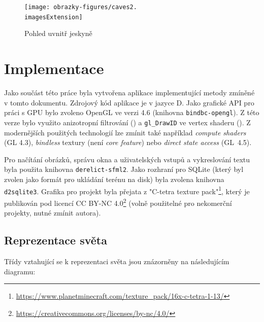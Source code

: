 \vfill

\begin{figure}[H]
	\texttt{[image: obrazky-figures/caves2.\\imagesExtension]}
	\caption{Pohled uvnitř jeskyně}
\end{figure}

\chapter{Implementace} \label{ch:impl}
Jako součást této práce byla vytvořena aplikace implementující metody zmíněné v tomto dokumentu. Zdrojový kód aplikace je v jazyce D. Jako grafické API pro práci s GPU bylo zvoleno OpenGL ve verzi 4.6 (knihovna \texttt{bindbc-opengl}). Z této verze bylo využito anizotropní filtrování () a \verb|gl_DrawID| ve vertex shaderu (). Z modernějších použitých technologií lze zmínit také například \textit{compute shaders} (GL 4.3), \textit{bindless} textury (není \textit{core feature}) nebo \textit{direct state access} (GL~4.5).

Pro načítání obrázků, správu okna a uživatelských vstupů a vykreslování textu byla použita knihovna \texttt{derelict-sfml2}. Jako rozhraní pro SQLite (který byl zvolen jako formát pro ukládání terénu na disk) byla zvolena knihovna \texttt{d2sqlite3}. Grafika pro projekt byla přejata z "C-tetra texture pack"\footnote{\url{https://www.planetminecraft.com/texture_pack/16x-c-tetra-1-13/}}, který je publikován pod licencí CC BY-NC 4.0\footnote{\url{https://creativecommons.org/licenses/by-nc/4.0/}} (volně použitelné pro nekomerční projekty, nutné zmínit autora).

\section{Reprezentace světa}
Třídy vztahující se k reprezentaci světa jsou znázorněny na následujícím diagramu:

